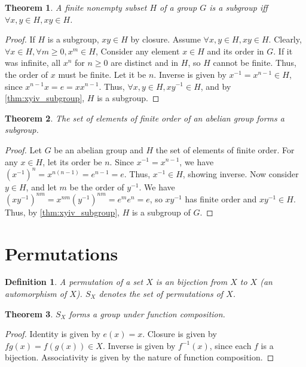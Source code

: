 \documentclass{article}
\newtheorem{theorem}{Theorem}[section]
\newtheorem{definition}{Definition}[section]
\begin{document}
\begin{theorem}
    \label{thm:finite_xy_subgroup}
    A finite nonempty subset $H$ of a group $G$ is a subgroup
    iff $\forall x,y \in H, xy \in H$.
\end{theorem}
\begin{proof}
    If $H$ is a subgroup, $xy \in H$ by closure.
    Assume $\forall x,y \in H, xy \in H$. 
    Clearly, $\forall x \in H, \forall m \ge 0, x^{m} \in H$,
    Consider any element $x \in H$ and its order in $G$.
    If it was infinite, all $x^{n}$ for $n \ge 0$ are distinct and in $H$, so $H$ cannot be finite.
    Thus, the order of $x$ must be finite. Let it be $n$.
    Inverse is given by $x^{-1} = x^{n - 1} \in H$, since $x^{n-1}x = e = xx^{n - 1}$.
    Thus, $\forall x,y \in H, xy^{-1} \in H$, and by \autoref{thm:xyiv_subgroup}, $H$ is a subgroup.
\end{proof}

\begin{theorem}
    The set of elements of finite order of an abelian group forms a subgroup.
\end{theorem}
\begin{proof}
    Let $G$ be an abelian group and $H$ the set of elements of finite order.
    For any $x \in H$, let its order be $n$.
    Since $x^{-1} = x^{n - 1}$, we have $(x^{-1})^{n} = x^{n(n - 1)} = e^{n - 1} = e$.
    Thus, $x^{-1} \in H$, showing inverse.
    Now consider $y \in H$, and let $m$ be the order of $y^{-1}$.
    We have $(xy^{-1})^{nm} = x^{nm}(y^{-1})^{nm} = e^{m}e^{n} = e$,
    so $xy^{-1}$ has finite order and $xy^{-1} \in H$.
    Thus, by \autoref{thm:xyiv_subgroup}, $H$ is a subgroup of $G$.
\end{proof}

\section{Permutations}

\begin{definition}
    A \emph{permutation} of a set $X$ is an bijection from $X$ to $X$ (an automorphism of $X$).
    $S_X$ denotes the set of permutations of $X$.
\end{definition}

\begin{theorem}
    $S_X$ forms a group under function composition.
\end{theorem}
\begin{proof}
    Identity is given by $e(x) = x$.
    Closure is given by $fg(x) = f(g(x)) \in X$.
    Inverse is given by $f^{-1}(x)$, since each $f$ is a bijection.
    Associativity is given by the nature of function composition.
\end{proof}
\end{document}
